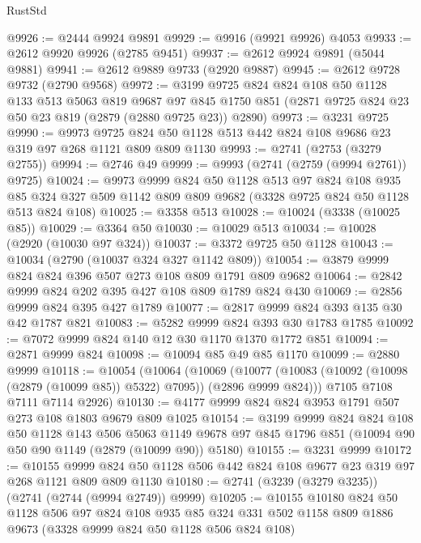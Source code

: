 \begin{lexlean}{RustStd}
\begin{coremodule}
@9926 := @2444 @9924 @9891
@9929 := @9916 (@9921 @9926) @4053
@9933 := @2612 @9920 @9926 (@2785 @9451)
@9937 := @2612 @9924 @9891 (@5044 @9881)
@9941 := @2612 @9889 @9733 (@2920 @9887)
@9945 := @2612 @9728 @9732 (@2790 @9568)
@9972 := @3199
    @9725
    @824
    @824
    @108
    @50
    @1128
    @133
    @513
    @5063
    @819
    @9687
    @97
    @845
    @1750
    @851
    (@2871 @9725 @824 @23 @50 @23 @819 (@2879 (@2880 @9725 @23)) @2890)
@9973 := @3231 @9725
@9990 := @9973
    @9725
    @824
    @50
    @1128
    @513
    @442
    @824
    @108
    @9686
    @23
    @319
    @97
    @268
    @1121
    @809
    @809
    @1130
@9993 := @2741 (@2753 (@3279 @2755))
@9994 := @2746 @49
@9999 := @9993 (@2741 (@2759 (@9994 @2761)) @9725)
@10024 := @9973
    @9999
    @824
    @50
    @1128
    @513
    @97
    @824
    @108
    @935
    @85
    @324
    @327
    @509
    @1142
    @809
    @809
    @9682
    (@3328 @9725 @824 @50 @1128 @513 @824 @108)
@10025 := @3358 @513
@10028 := @10024 (@3338 (@10025 @85))
@10029 := @3364 @50
@10030 := @10029 @513
@10034 := @10028 (@2920 (@10030 @97 @324))
@10037 := @3372 @9725 @50 @1128
@10043 := @10034 (@2790 (@10037 @324 @327 @1142 @809))
@10054 := @3879 @9999 @824 @824 @396 @507 @273 @108 @809 @1791 @809 @9682
@10064 := @2842 @9999 @824 @202 @395 @427 @108 @809 @1789 @824 @430
@10069 := @2856 @9999 @824 @395 @427 @1789
@10077 := @2817 @9999 @824 @393 @135 @30 @42 @1787 @821
@10083 := @5282 @9999 @824 @393 @30 @1783 @1785
@10092 := @7072 @9999 @824 @140 @12 @30 @1170 @1370 @1772 @851
@10094 := @2871 @9999 @824
@10098 := @10094 @85 @49 @85 @1170
@10099 := @2880 @9999
@10118 := @10054
    (@10064
      (@10069
        (@10077 (@10083 (@10092 (@10098 (@2879 (@10099 @85)) @5322) @7095)) (@2896 @9999 @824)))
      @7105
      @7108
      @7111
      @7114
      @2926)
@10130 := @4177 @9999 @824 @824 @3953 @1791 @507 @273 @108 @1803 @9679 @809 @1025
@10154 := @3199
    @9999
    @824
    @824
    @108
    @50
    @1128
    @143
    @506
    @5063
    @1149
    @9678
    @97
    @845
    @1796
    @851
    (@10094 @90 @50 @90 @1149 (@2879 (@10099 @90)) @5180)
@10155 := @3231 @9999
@10172 := @10155
    @9999
    @824
    @50
    @1128
    @506
    @442
    @824
    @108
    @9677
    @23
    @319
    @97
    @268
    @1121
    @809
    @809
    @1130
@10180 := @2741 (@3239 (@3279 @3235)) (@2741 (@2744 (@9994 @2749)) @9999)
@10205 := @10155
    @10180
    @824
    @50
    @1128
    @506
    @97
    @824
    @108
    @935
    @85
    @324
    @331
    @502
    @1158
    @809
    @1886
    @9673
    (@3328 @9999 @824 @50 @1128 @506 @824 @108)

\end{coremodule}
\end{lexlean}
